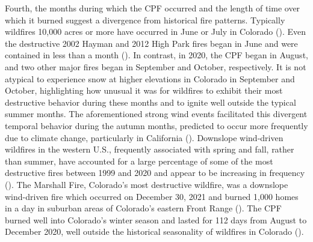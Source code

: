 \documentclass[
]{article}
\begin{document}
Fourth, the months during which the CPF occurred and the length of time over which it burned suggest a divergence from historical fire patterns. Typically wildfires 10,000 acres or more have occurred in June or July in Colorado (). Even the destructive 2002 Hayman and 2012 High Park fires began in June and were contained in less than a month (). In contrast, in 2020, the CPF began in August, and two other major fires began in September and October, respectively. It is not atypical to experience snow at higher elevations in Colorado in September and October, highlighting how unusual it was for wildfires to exhibit their most destructive behavior during these months and to ignite well outside the typical summer months. The aforementioned strong wind events facilitated this divergent temporal behavior during the autumn months, predicted to occur more frequently due to climate change, particularly in California (). Downslope wind-driven wildfires in the western U.S., frequently associated with spring and fall, rather than summer, have accounted for a large percentage of some of the most destructive fires between 1999 and 2020 and appear to be increasing in frequency (). The Marshall Fire, Colorado's most destructive wildfire, was a downslope wind-driven fire which occurred on December 30, 2021 and burned 1,000 homes in a day in suburban areas of Colorado's eastern Front Range (). The CPF burned well into Colorado's winter season and lasted for 112 days from August to December 2020, well outside the historical seasonality of wildfires in Colorado ().
\end{document}
